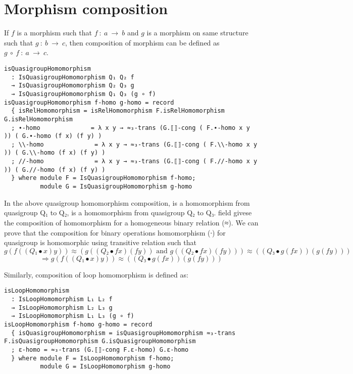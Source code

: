 \section{Morphism composition}
If $f$ is a morphism such that $f\ :\ a \ \rightarrow \ b$ and $g$ is a morphism on same
structure such that $g\ :\ b\ \rightarrow \ c$, then composition of morphism can be
defined as $g \ ∘\ f\ :\ a \ \rightarrow \ c$. 
\begin{verbatim}
isQuasigroupHomomorphism
  : IsQuasigroupHomomorphism Q₁ Q₂ f
  → IsQuasigroupHomomorphism Q₂ Q₃ g
  → IsQuasigroupHomomorphism Q₁ Q₃ (g ∘ f)
isQuasigroupHomomorphism f-homo g-homo = record
  { isRelHomomorphism = isRelHomomorphism F.isRelHomomorphism G.isRelHomomorphism
  ; ∙-homo              = λ x y → ≈₃-trans (G.⟦⟧-cong ( F.∙-homo x y )) ( G.∙-homo (f x) (f y) )
  ; \\-homo              = λ x y → ≈₃-trans (G.⟦⟧-cong ( F.\\-homo x y )) ( G.\\-homo (f x) (f y) )
  ; //-homo              = λ x y → ≈₃-trans (G.⟦⟧-cong ( F.//-homo x y )) ( G.//-homo (f x) (f y) )
  } where module F = IsQuasigroupHomomorphism f-homo; 
          module G = IsQuasigroupHomomorphism g-homo
\end{verbatim}
In the above quasigroup homomorphism composition,  is a homomorphism
from quasigroup Q₁ to Q₂,  is a homomorphism from quasigroup Q₂ to Q₃.
 field givese the composition of homomorphism for a
homogeneous binary relation (≈). We can prove that the composition for binary
operations homomorphism (∙) for quasigroup is homomorphic using transitive
relation  such that \[g (f ((Q₁ ∙ x) y)) ≈ (g ((Q₂ ∙ f x) (f
y)) \text{ and } g ((Q₂ ∙ f x) (f y))) ≈ ((Q₃ ∙ g (f x)) (g (f y)))\]
\[\Rightarrow g (f ((Q₁ ∙ x) y)) ≈ ((Q₃ ∙ g (f x)) (g (f y)))\]

Similarly, composition of loop homomorphism is defined as:
\begin{verbatim}
isLoopHomomorphism
  : IsLoopHomomorphism L₁ L₂ f
  → IsLoopHomomorphism L₂ L₃ g
  → IsLoopHomomorphism L₁ L₃ (g ∘ f)
isLoopHomomorphism f-homo g-homo = record
  { isQuasigroupHomomorphism = isQuasigroupHomomorphism ≈₃-trans F.isQuasigroupHomomorphism G.isQuasigroupHomomorphism
  ; ε-homo = ≈₃-trans (G.⟦⟧-cong F.ε-homo) G.ε-homo
  } where module F = IsLoopHomomorphism f-homo; 
          module G = IsLoopHomomorphism g-homo
\end{verbatim}

